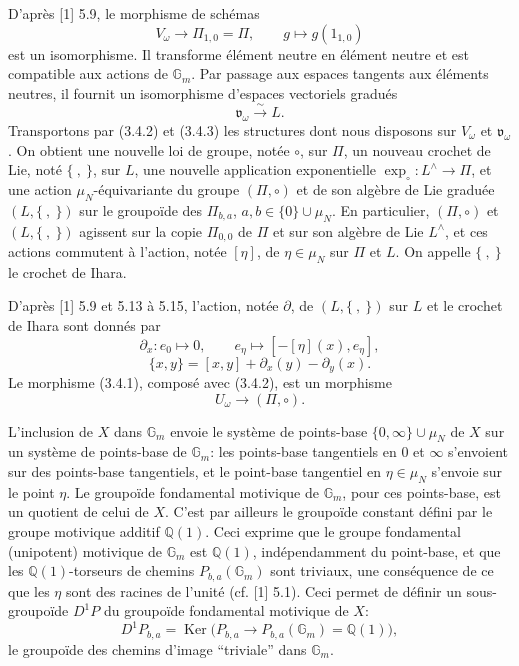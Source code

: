 \documentclass[10pt,a4paper]{article}
\newcommand{\Gm}{\mathbb G_m}
\newcommand{\muN}{\mu_N}
\newcommand{\Q}{\mathbb Q}
\newcommand{\Ker}{\operatorname{Ker}}
\newcommand{\vomega}{\mathfrak v_\omega}
\newcommand{\Lhat}{L^{\wedge}}
\theoremstyle{deligne}
\newcommand{\heading}[1]{\vspace{0.65em}\noindent{\bfseries #1}\quad}
\begin{document}
D'après [1] 5.9, le morphisme de schémas
\[
\tag{3.4.2}
V_\omega\longrightarrow\Pi_{1,0}=\Pi,\qquad g\longmapsto g(1_{1,0})
\]
est un isomorphisme. Il transforme élément neutre en élément neutre et est compatible aux actions de \(\Gm\). Par passage aux espaces tangents aux éléments neutres, il fournit un isomorphisme d'espaces vectoriels gradués
\[
\tag{3.4.3}
\vomega\overset{\sim}{\longrightarrow}L.
\]
Transportons par (3.4.2) et (3.4.3) les structures dont nous disposons sur \(V_\omega\) et \(\vomega\). On obtient une nouvelle loi de groupe, notée \(\circ\), sur \(\Pi\), un nouveau crochet de Lie, noté \(\{\ ,\ \}\), sur \(L\), une nouvelle application exponentielle \(\exp_\circ:\Lhat\to\Pi\), et une action \(\muN\)-équivariante du groupe \((\Pi,\circ)\) et de son algèbre de Lie graduée \((L,\{\ ,\ \})\) sur le groupoïde des \(\Pi_{b,a}\), \(a,b\in\{0\}\cup\muN\). En particulier, \((\Pi,\circ)\) et \((L,\{\ ,\ \})\) agissent sur la copie \(\Pi_{0,0}\) de \(\Pi\) et sur son algèbre de Lie \(\Lhat\), et ces actions commutent à l'action, notée \([\eta]\), de \(\eta\in\muN\) sur \(\Pi\) et \(L\). On appelle \(\{\ ,\ \}\) le crochet de Ihara.

D'après [1] 5.9 et 5.13 à 5.15, l'action, notée \(\partial\), de \((L,\{\ ,\ \})\) sur \(L\) et le crochet de Ihara sont donnés par
\[
\tag{3.4.4}
\partial_x:e_0\longmapsto0,\qquad e_\eta\longmapsto[-[\eta](x),e_\eta],
\]
\[
\tag{3.4.5}
\{x,y\}=[x,y]+\partial_x(y)-\partial_y(x).
\]
Le morphisme (3.4.1), composé avec (3.4.2), est un morphisme
\[
\tag{3.4.6}
U_\omega\longrightarrow(\Pi,\circ).
\]

\heading{3.5.} L'inclusion de \(X\) dans \(\Gm\) envoie le système de points-base \(\{0,\infty\}\cup\muN\) de \(X\) sur un système de points-base de \(\Gm\): les points-base tangentiels en \(0\) et \(\infty\) s'envoient sur des points-base tangentiels, et le point-base tangentiel en \(\eta\in\muN\) s'envoie sur le point \(\eta\). Le groupoïde fondamental motivique de \(\Gm\), pour ces points-base, est un quotient de celui de \(X\). C'est par ailleurs le groupoïde constant défini par le groupe motivique additif \(\Q(1)\). Ceci exprime que le groupe fondamental (unipotent) motivique de \(\Gm\) est \(\Q(1)\), indépendamment du point-base, et que les \(\Q(1)\)-torseurs de chemins \(P_{b,a}(\Gm)\) sont triviaux, une conséquence de ce que les \(\eta\) sont des racines de l'unité (cf. [1] 5.1). Ceci permet de définir un sous-groupoïde \(D^1P\) du groupoïde fondamental motivique de \(X\):
\[
\tag{3.5.1}
D^1P_{b,a}=\Ker\bigl(P_{b,a}\longrightarrow P_{b,a}(\Gm)=\Q(1)\bigr),
\]
le groupoïde des chemins d'image ``triviale'' dans \(\Gm\).
\end{document}
